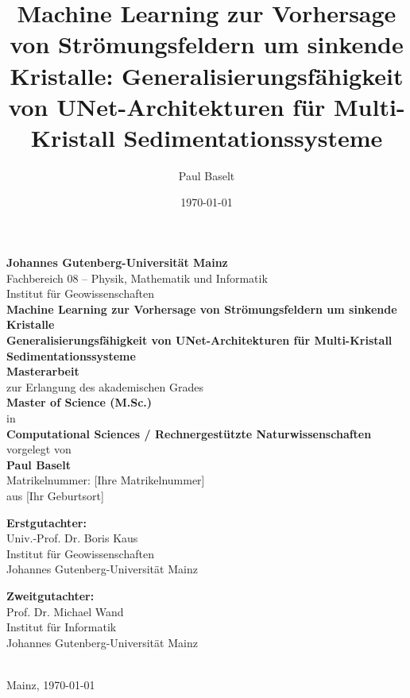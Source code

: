 \documentclass[12pt,twoside,openright]{scrreprt}
\title{Machine Learning zur Vorhersage von Strömungsfeldern um sinkende Kristalle: Generalisierungsfähigkeit von UNet-Architekturen für Multi-Kristall Sedimentationssysteme}
\author{Paul Baselt}
\date{\today}
\theoremstyle{definition}
\theoremstyle{plain}
\begin{document}
\begin{titlepage}
    \centering
    
    
    {\large \textbf{Johannes Gutenberg-Universität Mainz}}\\[0.5cm]
    {\large Fachbereich 08 -- Physik, Mathematik und Informatik}\\[0.5cm]
    {\large Institut für Geowissenschaften}\\[2cm]
    
    {\huge \textbf{Machine Learning zur Vorhersage von Strömungsfeldern um sinkende Kristalle}}\\[0.5cm]
    {\LARGE \textbf{Generalisierungsfähigkeit von UNet-Architekturen für Multi-Kristall Sedimentationssysteme}}\\[1.5cm]
    
    {\Large \textbf{Masterarbeit}}\\[0.5cm]
    zur Erlangung des akademischen Grades\\[0.3cm]
    {\large \textbf{Master of Science (M.Sc.)}}\\[0.3cm]
    in\\[0.3cm]
    {\large \textbf{Computational Sciences / Rechnergestützte Naturwissenschaften}}\\[2cm]
    
    vorgelegt von\\[0.5cm]
    {\large \textbf{Paul Baselt}}\\[0.3cm]
    Matrikelnummer: [Ihre Matrikelnummer]\\[0.3cm]
    aus [Ihr Geburtsort]\\[1.5cm]
    
    \begin{minipage}[t]{0.45\textwidth}
        \centering
        \textbf{Erstgutachter:}\\
        Univ.-Prof. Dr. Boris Kaus\\
        Institut für Geowissenschaften\\
        Johannes Gutenberg-Universität Mainz
    \end{minipage}
    \hfill
    \begin{minipage}[t]{0.45\textwidth}
        \centering
        \textbf{Zweitgutachter:}\\
        Prof. Dr. Michael Wand\\
        Institut für Informatik\\
        Johannes Gutenberg-Universität Mainz
    \end{minipage}\\[2cm]
    
    \vfill
    {\large Mainz, \today}
    
\end{titlepage}
\end{document}
